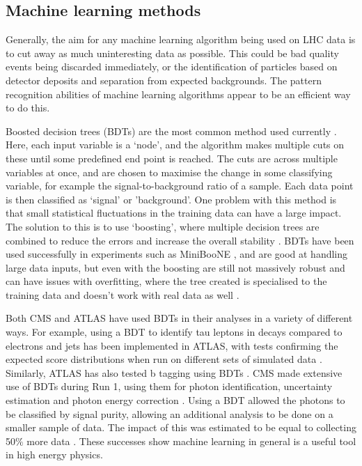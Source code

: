 \documentclass[12pt]{article}
\begin{document}
\subsection*{Machine learning methods}

Generally, the aim for any machine learning algorithm being used on LHC data is to cut away as much uninteresting data as possible. This could be bad quality events being discarded immediately, or the identification of particles based on detector deposits and separation from expected backgrounds. The pattern recognition abilities of machine learning algorithms appear to be an efficient way to do this. 

Boosted decision trees (BDTs) are the most common method used currently \cite{ml7}. Here, each input variable is a `node', and the algorithm makes multiple cuts on these until some predefined end point is reached. The cuts are across multiple variables at once, and are chosen to maximise the change in some classifying variable, for example the signal-to-background ratio of a sample. Each data point is then classified as `signal' or 'background'. One problem with this method is that small statistical fluctuations in the training data can have a large impact. The solution to this is to use `boosting', where multiple decision trees are combined to reduce the errors and increase the overall stability \cite{ml8}. BDTs have been used successfully in experiments such as MiniBooNE \cite{ml2}, and are good at handling large data inputs, but even with the boosting are still not massively robust and can have issues with overfitting, where the tree created is specialised to the training data and doesn't work with real data as well \cite{ml1}. 

Both CMS and ATLAS have used BDTs in their analyses in a variety of different ways. For example, using a BDT to identify tau leptons in decays compared to electrons and jets has been implemented in ATLAS, with tests confirming the expected score distributions when run on different sets of simulated data \cite{ml4}. Similarly, ATLAS has also tested b tagging using BDTs \cite{ml5}. CMS made extensive use of BDTs during Run 1, using them for photon identification, uncertainty estimation and photon energy correction \cite{ml6}. Using a BDT allowed the photons to be classified by signal purity, allowing an additional analysis to be done on a smaller sample of data. The impact of this was estimated to be equal to collecting 50$\%$ more data \cite{mlreview}. These successes show machine learning in general is a useful tool in high energy physics.
\end{document}
